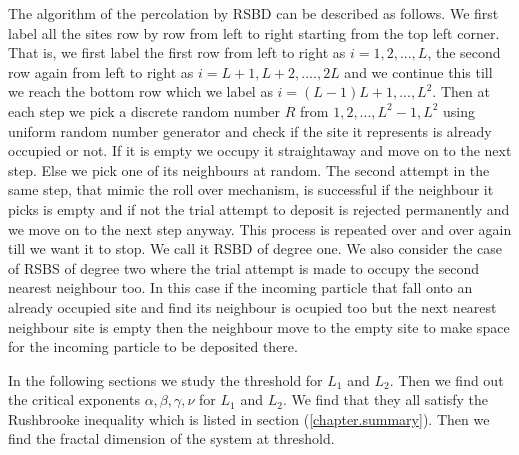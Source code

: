 	The algorithm of the percolation by RSBD can be described as follows. We first label all the sites
	row by row from left to right starting from the top left corner. That is, we first label the first row from
	left to right as $i=1,2,...,L$, the second row again from left to right as $i=L+1,L+2,....,2L$
	and we continue this till we reach the bottom row which we label as $i=(L-1)L+1,...,L^2$. 
	Then at each step we pick a discrete random number $R$ from $1,2,...,L^2-1,L^2$ using uniform random number
	generator and check if the site it represents is already occupied or not. If it is
	empty we occupy it straightaway and move on to the next step. Else we pick one of its neighbours at random. 
	The second attempt in the same step, that mimic the roll over mechanism, is successful if the neighbour
	it picks is empty and if not the trial attempt to deposit is rejected permanently and we move on to the next 
	step anyway. This process is
	repeated over and over again till we want it to stop. We call it RSBD of degree one. We also consider
	the case of RSBS of degree two where the trial attempt is made to occupy the second nearest neighbour too.
	In this case if the incoming particle that fall onto an already occupied site and find its 
	neighbour is ocupied too but the next nearest neighbour site is empty then the neighbour move to the empty
	site to make space for the incoming particle to be deposited there. 
	
	In the following sections we study the threshold for $L_1$ and $L_2$. Then we find out the critical exponents $\alpha, \beta, \gamma, \nu$ for $L_1$ and $L_2$. We find that they all satisfy the Rushbrooke inequality which is listed in section (\ref{chapter.summary}). Then we find the fractal dimension of the system at threshold.


	\label{sect:finding-numerical-values}
